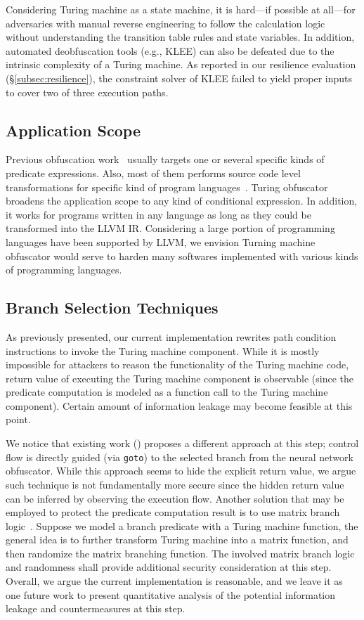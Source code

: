 \documentclass[lnicst]{svmultln}
\begin{document}
Considering Turing machine as a state machine, it is hard---if possible at
all---for adversaries with manual reverse engineering to follow the calculation
logic without understanding the transition table rules and state variables. In
addition, automated deobfuscation tools (e.g., KLEE) can also be defeated due to
the intrinsic complexity of a Turing machine. As reported in our resilience
evaluation (\S\ref{subsec:resilience}), the constraint solver of KLEE failed to
yield proper inputs to cover two of three execution paths.

\subsection{Application Scope}
Previous obfuscation work~\cite{Sharif} usually targets one or several specific
kinds of predicate expressions. Also, most of them performs source code level
transformations for specific kind of program languages~\cite{Trans}. Turing
obfuscator broadens the application scope to any kind of conditional expression.
In addition, it works for programs written in any language as long as they could
be transformed into the LLVM IR. Considering a large portion of programming
languages have been supported by LLVM, we envision Turning machine obfuscator
would serve to harden many softwares implemented with various kinds of
programming languages.

\subsection{Branch Selection Techniques}
As previously presented, our current implementation rewrites path condition
instructions to invoke the Turing machine component. While it is mostly
impossible for attackers to reason the functionality of the Turing machine code,
return value of executing the Turing machine component is observable (since the
predicate computation is modeled as a function call to the Turing machine
component). Certain amount of information leakage may become feasible at this
point.

We notice that existing work (\cite{Ma, Maieee}) proposes a different approach
at this step; control flow is directly guided (via \texttt{goto}) to the
selected branch from the neural network obfuscator. While this approach seems to
hide the explicit return value, we argue such technique is not fundamentally
more secure since the hidden return value can be inferred by observing the
execution flow. Another solution that may be employed to protect the predicate
computation result is to use matrix branch logic~\cite{Samjam}. Suppose we model
a branch predicate with a Turing machine function, the general idea is to
further transform Turing machine into a matrix function, and then randomize the
matrix branching function. The involved matrix branch logic and randomness shall
provide additional security consideration at this step. Overall, we argue the
current implementation is reasonable, and we leave it as one future work to
present quantitative analysis of the potential information leakage and
countermeasures at this step.
\end{document}
